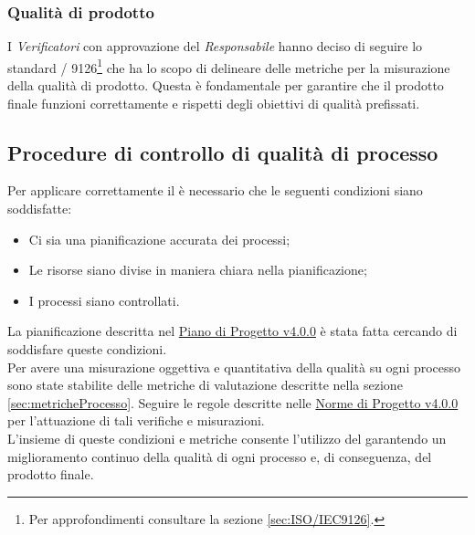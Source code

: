 \documentclass{scalatekids-article}
\begin{document}
\subsubsection{Qualità di prodotto}
I \textit{Verificatori} con approvazione del \textit{Responsabile} hanno deciso di seguire lo standard / 9126\footnote[3]{Per approfondimenti consultare la sezione \ref{sec:ISO/IEC9126}.} che ha lo scopo di delineare delle metriche per la misurazione della qualità di prodotto. Questa è fondamentale per garantire che il prodotto  finale funzioni correttamente e rispetti degli obiettivi di qualità prefissati.
\subsection{Procedure di controllo di qualità di processo}
Per applicare correttamente il  è necessario che le seguenti condizioni siano soddisfatte:
\begin{itemize}
\item{Ci sia una pianificazione accurata dei processi;}
\item{Le risorse siano divise in maniera chiara nella pianificazione;}
\item{I processi siano controllati.}
\end{itemize}
La pianificazione descritta nel \href{run:./PianoDiProgetto\_v4.0.0.pdf}{Piano di Progetto v4.0.0} è stata fatta cercando di soddisfare queste condizioni.\\
Per avere una misurazione oggettiva e quantitativa della qualità su ogni processo sono state stabilite delle metriche di valutazione descritte nella sezione \ref{sec:metricheProcesso}. Seguire le regole descritte nelle \href{run:../Interni/NormeDiProgetto\_v4.0.0.pdf}{Norme di Progetto v4.0.0} per l'attuazione di tali verifiche e misurazioni.\\
L'insieme di queste condizioni e metriche consente l'utilizzo del  garantendo un miglioramento continuo della qualità di ogni processo e, di conseguenza, del prodotto finale.
\end{document}
